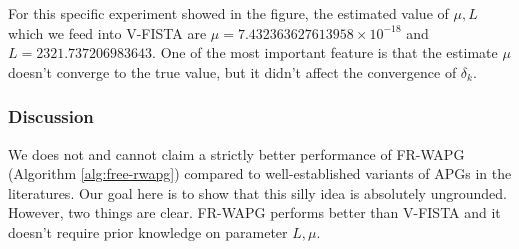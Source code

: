 \documentclass[12pt]{article}
\begin{document}
            For this specific experiment showed in the figure, the estimated value of $\mu, L$ which we feed into V-FISTA are $\mu = 7.432363627613958\times 10^{-18}$ and $L = 2321.737206983643$. 
            One of the most important feature is that the estimate $\mu$ doesn't converge to the true value, but it didn't affect the convergence of $\delta_k$. 

        \subsubsection{Discussion}
            We does not and cannot claim a strictly better performance of FR-WAPG (Algorithm \ref{alg:free-rwapg}) compared to well-established variants of APGs in the literatures. 
            Our goal here is to show that this silly idea is absolutely ungrounded. 
            However, two things are clear. FR-WAPG performs better than V-FISTA and it doesn't require prior knowledge on parameter $L, \mu$. 
            




\appendix
\end{document}

